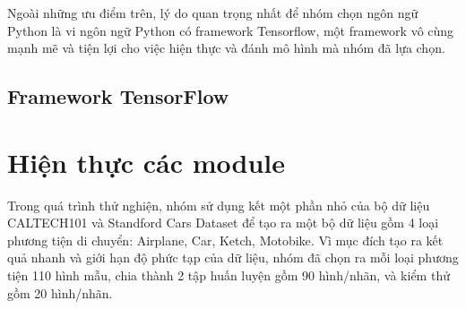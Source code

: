 \documentclass[a4paper,14pt]{extreport}
\begin{document}
Ngoài những ưu điểm trên, lý do quan trọng nhất để nhóm chọn ngôn ngữ Python là vi ngôn ngữ Python có framework Tensorflow, một framework vô cùng mạnh mẽ và tiện lợi cho việc hiện thực và đánh mô hình mà nhóm đã lựa chọn.

\subsection{Framework TensorFlow}



\section{Hiện thực các module}
Trong quá trình thử nghiện, nhóm sử dụng kết một phần nhỏ của bộ dữ liệu CALTECH101 và Standford Cars Dataset để tạo ra một bộ dữ liệu gồm 4 loại phương tiện di chuyển: Airplane, Car, Ketch, Motobike. Vì mục đích tạo ra kết quả nhanh và giới hạn độ phức tạp của dữ liệu, nhóm đã chọn ra mỗi loại phương tiện 110 hình mẫu, chia thành 2 tập huấn luyện gồm 90 hình/nhãn, và kiểm thử gồm 20 hình/nhãn.
\end{document}
